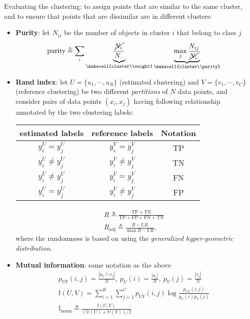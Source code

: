 Evaluating the clustering: to assign points that are similar to the same cluster, 
and to ensure that points that are dissimilar are in different clusters:
\begin{itemize}
    \item \textbf{Purity}: let $N_{ij}$ be the number of objects in cluster $i$ that belong to class $j$
    \begin{gather}
        \text{purity} \triangleq \sum_i
        \underbrace{\frac{\cancel{N_{i\cdot}}}{N_{\cdot\cdot}}}_\text{\makecell{cluster\\weight}}
        \underbrace{\max_j\frac{N_{ij}}{\cancel{N_{i\cdot}}}}_\text{\makecell{cluster\\purity}}
    \end{gather}

    \item \textbf{Rand index}: let $U=\{u_1,\cdots,u_R\}$ (estimated clustering) and 
    $V=\{v_1,\cdots,v_C\}$ (reference clustering) be two different \textit{partitions} of $N$ data points,
    and consider pairs of data points $(x_i,x_j)$
    having following relationship annotated by the two clustering labels:
    \begin{center}
        \begin{tabular}{ccc}
            \toprule
            estimated labels & reference labels & Notation \\
            \midrule
            $y^U_i = y^U_j$ & $y^V_i=y^V_j$ & $\mathrm{TP}$ \\
            $y^U_i \neq y^U_j$ & $y^V_i \neq y^V_j$ & $\mathrm{TN}$ \\
            $y^U_i \neq y^U_j$ & $y^V_i = y^V_j$ & $\mathrm{FN}$ \\
            $y^U_i = y^U_j$ & $y^V_i \neq y^V_j$ & $\mathrm{FP}$ \\
            \bottomrule
        \end{tabular}
    \end{center}
    \begin{gather}
        R \triangleq \frac{\mathrm{TP} + \mathrm{TN}}{\mathrm{TP} + \mathrm{FP} + \mathrm{FN} + \mathrm{TN}} \\
        R_\text{adj} \triangleq \frac{R-\mathbb{E}R}{\max R - \mathbb{E}R},
    \end{gather}
    where the randomness is based on using the \textit{generalized hyper-geometric distribution}.

    \item \textbf{Mutual information}: same notation as the above
    \begin{gather}
        p_{UV}(i,j)=\frac{|u_i\cap v_j|}{N},~p_U(i)=\frac{|u_i|}{N},~p_V(j)=\frac{|v_j|}{N} \\
        \mathbb{I}(U,V) = \sum_{i=1}^R\sum_{j=1}^C p_{UV}(i,j)\log\frac{p_{UV}(i,j)}{p_U(i)p_V(j)} \\
        \mathbb{I}_\text{norm} \triangleq \frac{\mathbb{I}(U,V)}{(\mathbb{H}(U) + \mathbb{H}(V))/ 2}
    \end{gather}
\end{itemize}

